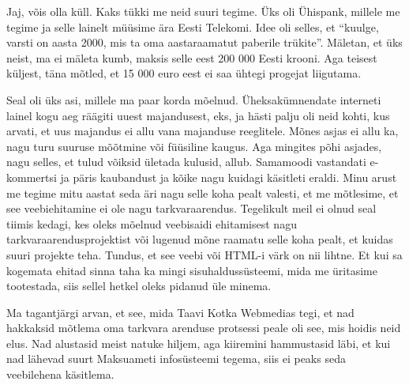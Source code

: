 
Jaj, võis olla küll. Kaks tükki me neid suuri tegime. Üks oli Ühispank, millele me tegime ja selle lainelt müüsime ära Eesti Telekomi. Idee oli selles, et \enquote{kuulge, varsti on aasta 2000, mis ta oma aastaraamatut paberile trükite}. Mäletan, et üks neist, ma ei mäleta kumb, maksis selle eest 200 000 Eesti krooni. Aga teisest küljest, täna mõtled, et 15 000 euro eest ei saa ühtegi progejat liigutama.


Seal oli üks asi, millele ma paar korda mõelnud. Üheksakümnendate interneti lainel kogu aeg räägiti uuest majandusest, eks, ja hästi palju oli neid kohti, kus arvati, et uus majandus ei allu vana majanduse reeglitele. Mõnes asjas ei allu ka, nagu turu suuruse mõõtmine või füüsiline kaugus. Aga mingites põhi asjades, nagu selles, et tulud võiksid ületada kulusid, allub. Samamoodi vastandati e-kommertsi ja päris kaubandust ja kõike nagu kuidagi käsitleti eraldi. Minu arust me tegime mitu aastat seda äri nagu selle koha pealt valesti, et me mõtlesime, et see veebiehitamine ei ole nagu tarkvaraarendus. Tegelikult meil ei olnud seal tiimis kedagi, kes oleks mõelnud veebisaidi ehitamisest nagu tarkvaraarendusprojektist või lugenud mõne raamatu selle koha pealt, et kuidas suuri projekte teha. Tundus, et see veebi või HTML-i värk on nii lihtne. Et kui sa kogemata ehitad sinna taha ka mingi sisuhaldussüsteemi, mida me üritasime tootestada, siis sellel hetkel oleks pidanud  üle minema. 

Ma tagantjärgi arvan, et see, mida Taavi Kotka  Webmedias   tegi, et nad hakkaksid mõtlema oma tarkvara arenduse protsessi peale oli see, mis hoidis neid  elus. Nad alustasid meist  natuke hiljem, aga kiiremini hammustasid läbi, et kui nad lähevad suurt Maksuameti infosüsteemi tegema, siis ei peaks seda veebilehena käsitlema. 


